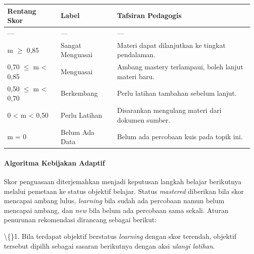 \documentclass[12pt,a4paper]{article}
\begin{document}
\begin{table}[h]

\centering

\begin{tabular}{lll}

\toprule

Rentang Skor & Label & Tafsiran Pedagogis \\

\midrule

--- & --- & --- \\

m $\ge$ 0,85 & Sangat Menguasai & Materi dapat dilanjutkan ke tingkat pendalaman. \\

0,70 $\le$ m \textless{} 0,85 & Menguasai & Ambang mastery terlampaui, boleh lanjut materi baru. \\

0,50 $\le$ m \textless{} 0,70 & Berkembang & Perlu latihan tambahan sebelum lanjut. \\

0 \textless{} m \textless{} 0,50 & Perlu Latihan & Disarankan mengulang materi dari dokumen sumber. \\

m = 0 & Belum Ada Data & Belum ada percobaan kuis pada topik ini. \\

\bottomrule

\end{tabular}

\end{table}

\paragraph*{Algoritma Kebijakan Adaptif}

Skor penguasaan diterjemahkan menjadi keputusan langkah belajar berikutnya melalui pemetaan ke status objektif belajar. Status \textit{mastered} diberikan bila skor mencapai ambang lulus, \textit{learning} bila sudah ada percobaan namun belum mencapai ambang, dan \textit{new} bila belum ada percobaan sama sekali. Aturan penurunan rekomendasi dirancang sebagai berikut:



\textbackslash\{\}1. Bila terdapat objektif berstatus \textit{learning} dengan skor terendah, objektif tersebut dipilih sebagai sasaran berikutnya dengan aksi \textit{ulangi latihan}.
\end{document}
